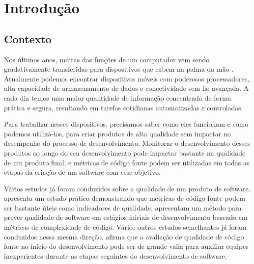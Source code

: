 \chapter{Introdução}
\section{Contexto}


Nos últimos anos, muitas das funções de um computador vem sendo gradativamente transferidas para dispositivos que cabem na palma da mão \cite{mobilemassmedia}. Atualmente podemos encontrar dispositivos móveis com poderosos processadores, alta capacidade de armazenamento de dados e conectividade sem fio avançada. A cada dia temos uma maior quantidade de informação concentrada de forma prática e segura, resultando em tarefas cotidianas automatizadas e controladas.

Para trabalhar nesses dispositivos, precisamos saber como eles funcionam e como podemos utilizá-los, para criar produtos de alta qualidade sem impactar no desempenho do processo de desenvolvimento. Monitorar o desenvolvimento desses produtos ao longo do seu desenvolvimento pode impactar bastante na qualidade de um produto final, e métricas de código fonte podem ser utilizadas em todas as etapas da criação de um software com esse objetivo. 

Vários estudos já foram conduzidos sobre a qualidade de um produto de software.  apresenta um estudo prático demonstrando que métricas de código fonte podem ser bastante úteis como indicadores de qualidade.  apresentam um método para prever qualidade de software em estágios iniciais de desenvolvimento baseado em métricas de complexidade de código. Vários outros estudos semelhantes já foram conduzidos nessa mesma direção.  afirma que a avaliação de qualidade de código fonte no início do desenvolvimento pode ser de grande valia para auxiliar equipes inexperientes durante as etapas seguintes do desenvolvimento de software.

